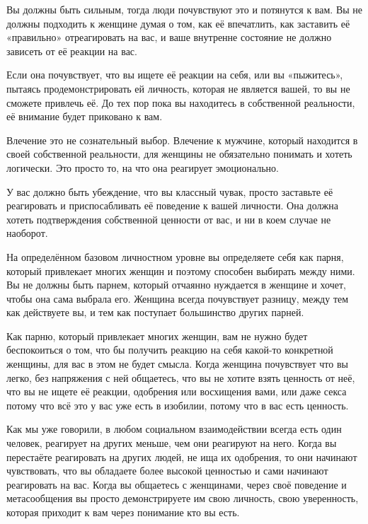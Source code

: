 Вы должны быть сильным, тогда люди почувствуют это и потянутся к вам. Вы не должны подходить к женщине думая о том, как её впечатлить, как заставить её «правильно» отреагировать на вас, и ваше внутренне состояние не должно зависеть от её реакции на вас.

Если она почувствует, что вы ищете её реакции на себя, или вы «пыжитесь», пытаясь продемонстрировать ей личность, которая не является вашей, то вы не сможете привлечь её. До тех пор пока вы находитесь в собственной реальности, её внимание будет приковано к вам.

Влечение это не сознательный выбор. Влечение к мужчине, который находится в своей собственной реальности, для женщины не обязательно понимать и хотеть логически. Это просто то, на что она реагирует эмоционально.

У вас должно быть убеждение, что вы классный чувак, просто заставьте её реагировать и приспосабливать её поведение к вашей личности. Она должна хотеть подтверждения собственной ценности от вас, и ни в коем случае не наоборот.

\RULE  На определённом базовом личностном уровне вы определяете себя как парня, который привлекает многих женщин и поэтому способен выбирать между ними. Вы не должны быть парнем, который отчаянно нуждается в женщине и хочет, чтобы она сама выбрала его. Женщина всегда почувствует разницу, между тем как действуете вы, и тем как поступает большинство других парней.

Как парню, который привлекает многих женщин, вам не нужно будет беспокоиться о том, что бы получить реакцию на себя какой-то конкретной женщины, для вас в этом не будет смысла. Когда женщина почувствует что вы легко, без напряжения с ней общаетесь, что вы не хотите взять ценность от неё, что вы не ищете её реакции, одобрения или восхищения вами, или даже секса потому что всё это у вас уже есть в изобилии, потому что в вас есть ценность.

Как мы уже говорили, в любом социальном взаимодействии всегда есть один человек, реагирует на других меньше, чем они реагируют на него. Когда вы перестаёте реагировать на других людей, не ища их одобрения, то они начинают чувствовать, что вы обладаете более высокой ценностью и сами начинают реагировать на вас. Когда вы общаетесь с женщинами, через своё поведение и метасообщения вы просто демонстрируете им свою личность, свою уверенность, которая приходит к вам через понимание кто вы есть.
